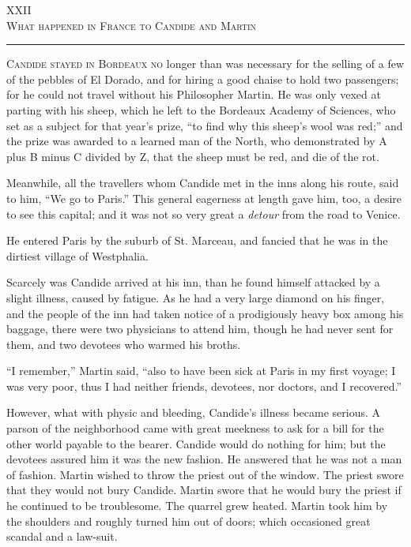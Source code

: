 \begin{center}
XXII\\
\textsc{What happened in France to Candide and Martin}
\end{center}
\vspace{-0.5cm}
\rule{\textwidth}{0.5pt}
\lettrine{C}{andide stayed in Bordeaux no} longer than was necessary for the selling of a few of the pebbles of El Dorado, and for hiring a good chaise to hold two passengers; for he could not travel without his Philosopher Martin. He was only vexed at parting with his sheep, which he left to the Bordeaux Academy of Sciences, who set as a subject for that year's prize, ``to find why this sheep's wool was red;'' and the prize was awarded to a learned man of the North, who demonstrated by A plus B minus C divided by Z, that the sheep must be red, and die of the rot.

Meanwhile, all the travellers whom Candide met in the inns along his route, said to him, ``We go to Paris.'' This general eagerness at length gave him, too, a desire to see this capital; and it was not so very great a \textit{detour} from the road to Venice.

He entered Paris by the suburb of St. Marceau, and fancied that he was in the dirtiest village of Westphalia.

Scarcely was Candide arrived at his inn, than he found himself attacked by a slight illness, caused by fatigue. As he had a very large diamond on his finger, and the people of the inn had taken notice of a prodigiously heavy box among his baggage, there were two physicians to attend him, though he had never sent for them, and two devotees who warmed his broths.

``I remember,'' Martin said, ``also to have been sick at Paris in my first voyage; I was very poor, thus I had neither friends, devotees, nor doctors, and I recovered.''

However, what with physic and bleeding, Candide's illness became serious. A parson of the neighborhood came with great meekness to ask for a bill for the other world payable to the bearer. Candide would do nothing for him; but the devotees assured him it was the new fashion. He answered that he was not a man of fashion. Martin wished to throw the priest out of the window. The priest swore that they would not bury Candide. Martin swore that he would bury the priest if he continued to be troublesome. The quarrel grew heated. Martin took him by the shoulders and roughly turned him out of doors; which occasioned great scandal and a law-suit.

